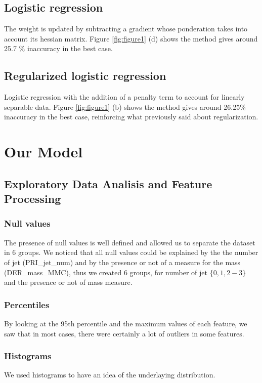 \documentclass[10pt,conference,compsocconf]{IEEEtran}
\begin{document}
\subsection{Logistic regression}
The weight is updated by subtracting a gradient whose ponderation takes into account its hessian matrix. Figure \ref{fig:figure1} (d) shows the method gives around 25.7 \% inaccuracy in the best case.
\subsection{Regularized logistic regression}
Logistic regression with the addition of a penalty term to account for linearly separable data. Figure \ref{fig:figure1} (b) shows the method gives around 26.25\% inaccuracy in the best case, reinforcing what previously said about regularization.
\section{Our Model}
\subsection{Exploratory Data Analisis and Feature Processing}
\subsubsection{Null values}
The presence of null values is well defined and allowed us to separate the
dataset in 6 groups. We noticed that all null values could be
explained by the the number of jet (PRI\_jet\_num) and by the presence or not of a
measure for the mass (DER\_mass\_MMC), thus we created 6 groups, for number of jet
$\lbrace 0, 1, 2-3 \rbrace$ and the presence or not of mass measure.

\subsubsection{Percentiles}

By looking at the 95th percentile and the maximum values of each feature, we saw
that in most cases, there were certainly a lot of outliers in some features.

\subsubsection{Histograms}

We used histograms to have an idea of the underlaying distribution.
\end{document}
